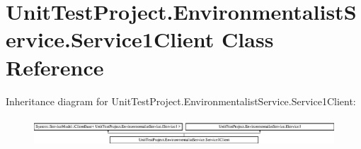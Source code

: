 \hypertarget{class_unit_test_project_1_1_environmentalist_service_1_1_service1_client}{}\section{Unit\+Test\+Project.\+Environmentalist\+Service.\+Service1\+Client Class Reference}
\label{class_unit_test_project_1_1_environmentalist_service_1_1_service1_client}
Inheritance diagram for Unit\+Test\+Project.\+Environmentalist\+Service.\+Service1\+Client\+:\begin{figure}[H]
\begin{center}
\leavevmode
\includegraphics[height=1.083172cm]{class_unit_test_project_1_1_environmentalist_service_1_1_service1_client}
\end{center}
\end{figure}
